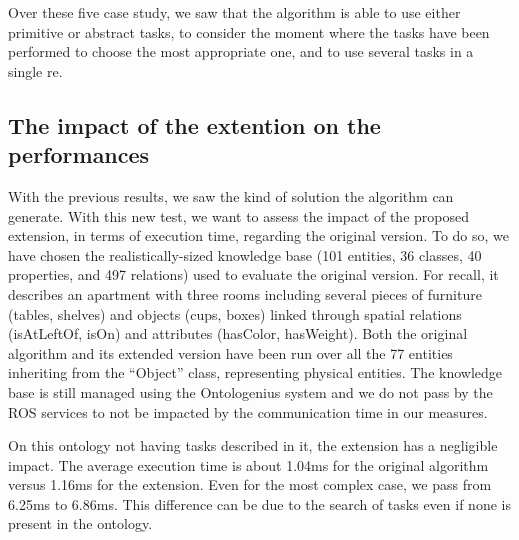 Over these five case study, we saw that the algorithm is able to use either primitive or abstract tasks, to consider the moment where the tasks have been performed to choose the most appropriate one, and to use several tasks in a single \acrshort{re}.

\subsection{The impact of the extention on the performances}

With the previous results, we saw the kind of solution the algorithm can generate. With this new test, we want to assess the impact of the proposed extension, in terms of execution time, regarding the original version. To do so, we have chosen the realistically-sized knowledge base (101 entities, 36 classes, 40 properties, and 497 relations) used to evaluate the original version. For recall, it describes an apartment with three rooms including several pieces of furniture (tables, shelves) and objects (cups, boxes) linked through spatial relations (isAtLeftOf, isOn) and attributes (hasColor, hasWeight). Both the original algorithm and its extended version have been run over all the 77 entities inheriting from the ``Object'' class, representing physical entities. The knowledge base is still managed using the Ontologenius system and we do not pass by the ROS services to not be impacted by the communication time in our measures.

On this ontology not having tasks described in it, the extension has a negligible impact. The average execution time is about 1.04ms for the original algorithm versus 1.16ms for the extension. Even for the most complex case, we pass from 6.25ms to 6.86ms. This difference can be due to the search of tasks even if none is present in the ontology.

